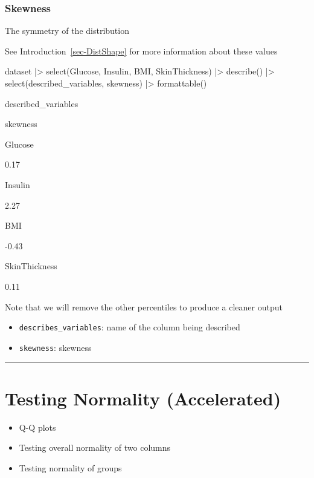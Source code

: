 \documentclass[
  letterpaper,
  DIV=11,
  numbers=noendperiod]{scrreprt}
\newenvironment{Shaded}{\begin{snugshade}}{\end{snugshade}}
\newcommand{\FunctionTok}[1]{\textcolor[rgb]{0.28,0.35,0.67}{#1}}
\newcommand{\NormalTok}[1]{\textcolor[rgb]{0.00,0.23,0.31}{#1}}
\newcommand{\SpecialCharTok}[1]{\textcolor[rgb]{0.37,0.37,0.37}{#1}}
\begin{document}
\hypertarget{skewness-1}{%
\subsubsection{Skewness}\label{skewness-1}}

The symmetry of the distribution

See Introduction~\ref{sec-DistShape} for more information about these
values

\begin{Shaded}
\begin{Highlighting}[]
\NormalTok{dataset }\SpecialCharTok{|\textgreater{}}
  \FunctionTok{select}\NormalTok{(Glucose, Insulin, BMI, SkinThickness) }\SpecialCharTok{|\textgreater{}}
  \FunctionTok{describe}\NormalTok{() }\SpecialCharTok{|\textgreater{}}
  \FunctionTok{select}\NormalTok{(described\_variables, skewness) }\SpecialCharTok{|\textgreater{}}
  \FunctionTok{formattable}\NormalTok{()}
\end{Highlighting}
\end{Shaded}

described\_variables

skewness

Glucose

0.17

Insulin

2.27

BMI

-0.43

SkinThickness

0.11

Note that we will remove the other percentiles to produce a cleaner
output

\begin{itemize}
\item
  \texttt{describes\_variables}: name of the column being described
\item
  \texttt{skewness}: skewness
\end{itemize}

\begin{center}\rule{0.5\linewidth}{0.5pt}\end{center}

\hypertarget{testing-normality-accelerated}{%
\section{Testing Normality
(Accelerated)}\label{testing-normality-accelerated}}

\begin{itemize}
\item
  Q-Q plots
\item
  Testing overall normality of two columns
\item
  Testing normality of groups
\end{itemize}
\end{document}

